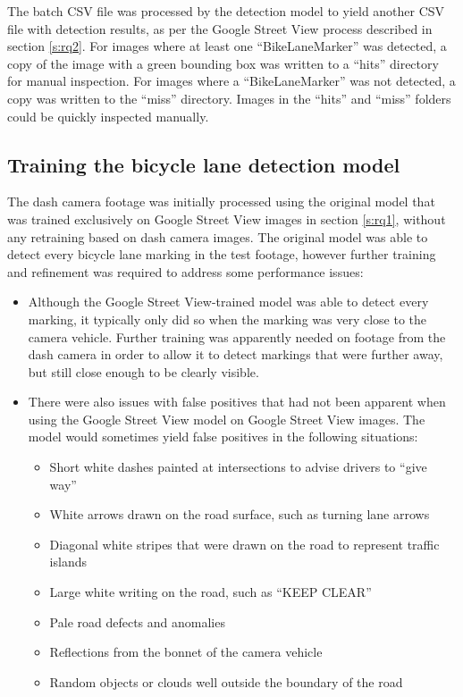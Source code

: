 \documentclass[11pt,twoside]{report}
\begin{document}
The batch CSV file was processed by the detection model to yield another CSV file with detection results, as per the Google Street View process described in section \ref{s:rq2}.  For images where at least one ``BikeLaneMarker'' was detected, a copy of the image with a green bounding box was written to a ``hits'' directory for manual inspection.  For images where a ``BikeLaneMarker'' was not detected, a copy was written to the ``miss'' directory.  Images in the ``hits'' and ``miss'' folders could be quickly inspected manually.


\subsection{Training the bicycle lane detection model}
\label{rq3c}

The dash camera footage was initially processed using the original model that was trained exclusively on Google Street View images in section \ref{s:rq1}, without any retraining based on dash camera images.  The original model was able to detect every bicycle lane marking in the test footage, however further training and refinement was required to address some performance issues:

\begin{itemize}
\item{Although the Google Street View-trained model was able to detect every marking, it typically only did so when the marking was very close to the camera vehicle.  Further training was apparently needed on footage from the dash camera in order to allow it to detect markings that were further away, but still close enough to be clearly visible.}
\item{There were also issues with false positives that had not been apparent when using the Google Street View model on Google Street View images.  The model would sometimes yield false positives in the following situations:

	\begin{itemize}
	\item{Short white dashes painted at intersections to advise drivers to ``give way''}
	\item{White arrows drawn on the road surface, such as turning lane arrows}
	\item{Diagonal white stripes that were drawn on the road to represent traffic islands}
	\item{Large white writing on the road, such as ``KEEP CLEAR''}
	\item{Pale road defects and anomalies}
	\item{Reflections from the bonnet of the camera vehicle}
	\item{Random objects or clouds well outside the boundary of the road}
	\end{itemize}
}
\end{itemize}
\end{document}
